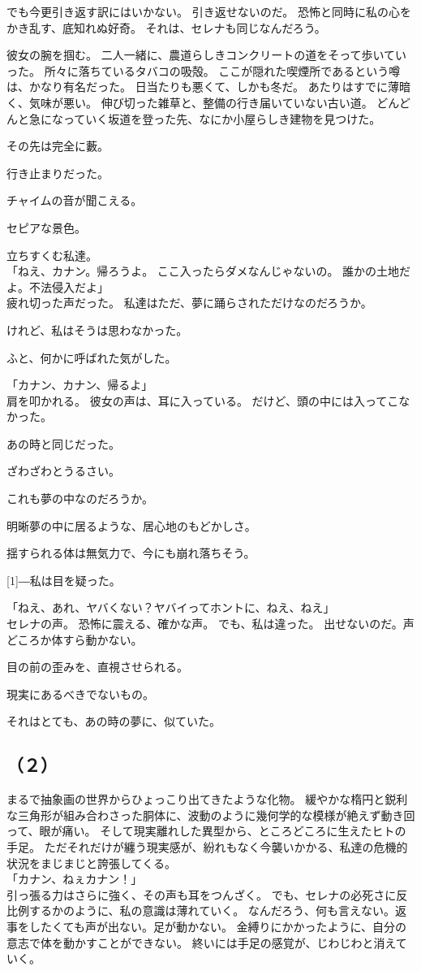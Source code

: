 \documentclass[../IHMain]{subfiles}
\begin{document}
でも今更引き返す訳にはいかない。
引き返せないのだ。
恐怖と同時に私の心をかき乱す、底知れぬ好奇。
それは、セレナも同じなんだろう。

彼女の腕を掴む。
二人一緒に、農道らしきコンクリートの道をそって歩いていった。
所々に落ちているタバコの吸殻。
ここが隠れた喫煙所であるという噂は、かなり有名だった。
日当たりも悪くて、しかも冬だ。
あたりはすでに薄暗く、気味が悪い。
伸び切った雑草と、整備の行き届いていない古い道。
どんどんと急になっていく坂道を登った先、なにか小屋らしき建物を見つけた。

その先は完全に藪。

行き止まりだった。

チャイムの音が聞こえる。

セピアな景色。

立ちすくむ私達。\\
「ねえ、カナン。帰ろうよ。
ここ入ったらダメなんじゃないの。
誰かの土地だよ。不法侵入だよ」\\
疲れ切った声だった。
私達はただ、夢に踊らされただけなのだろうか。

けれど、私はそうは思わなかった。

ふと、何かに呼ばれた気がした。

「カナン、カナン、帰るよ」\\
肩を叩かれる。
彼女の声は、耳に入っている。
だけど、頭の中には入ってこなかった。

あの時と同じだった。

ざわざわとうるさい。

これも夢の中なのだろうか。

明晰夢の中に居るような、居心地のもどかしさ。

揺すられる体は無気力で、今にも崩れ落ちそう。

\scalebox{3}[1]{―}私は目を疑った。

「ねえ、あれ、ヤバくない？ヤバイってホントに、ねえ、ねえ」\\
セレナの声。
恐怖に震える、確かな声。
でも、私は違った。
出せないのだ。声どころか体すら動かない。

目の前の歪みを、直視させられる。

現実にあるべきでないもの。

それはとても、あの時の夢に、似ていた。

\subsection*{（２）}

まるで抽象画の世界からひょっこり出てきたような化物。
緩やかな楕円と鋭利な三角形が組み合わさった胴体に、波動のように幾何学的な模様が絶えず動き回って、眼が痛い。
そして現実離れした異型から、ところどころに生えたヒトの手足。
ただそれだけが纏う現実感が、紛れもなく今襲いかかる、私達の危機的状況をまじまじと誇張してくる。\\
「カナン、ねぇカナン！」\\
引っ張る力はさらに強く、その声も耳をつんざく。
でも、セレナの必死さに反比例するかのように、私の意識は薄れていく。
なんだろう、何も言えない。返事をしたくても声が出ない。足が動かない。
金縛りにかかったように、自分の意志で体を動かすことができない。
終いには手足の感覚が、じわじわと消えていく。
\end{document}
